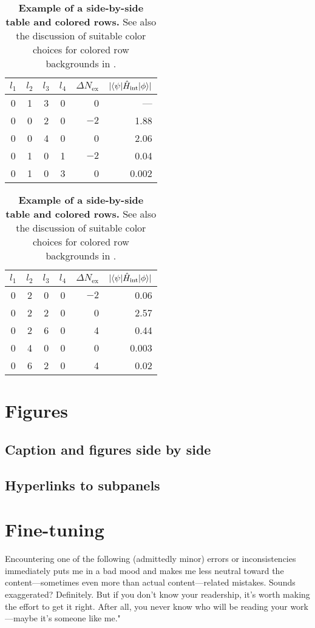 \begin{table}
	\centering 
	\caption{\textbf{Example of a side-by-side table and colored rows.} See also the discussion of suitable color choices for colored row backgrounds in .}
	\label{tab:table3}
	\vspace{5ex}
	\begin{tabular}{ccccrr} 
		\toprule
		$l_1$ & $l_2$ & $l_3$ & $l_4$ & $\Delta N_\text{ex}$ & $|\langle \psi | \hat{H}_\text{int} | \phi \rangle|$  \\ 
		\midrule 
		\rowcolor{pqred} 0 & 1 & 3 & 0 & 0 & ---\\
		0 & 0 & 2 & 0 & $-2$ & 1.88\\
		\rowcolor{pqblue} 0 & 0 & 4 & 0 & 0 & 2.06\\
		0 & 1 & 0 & 1 & $-2$ & 0.04\\
		\rowcolor{pqyellow} 0 & 1 & 0 & 3 & 0 & 0.002\\
		\bottomrule
	\end{tabular}
	\hspace{0.5cm}
	\begin{tabular}{ccccrr} 
		\toprule
		$l_1$ & $l_2$ & $l_3$ & $l_4$ & $\Delta N_\text{ex}$ & $|\langle \psi | \hat{H}_\text{int} | \phi \rangle|$  \\ 
		\midrule 
		0 & 2 & 0 & 0 & $-2$ & 0.06\\
		\rowcolor{pqblue} 0 & 2 & 2 & 0 & 0 & 2.57\\
		0 & 2 & 6 & 0 & 4 & 0.44\\
		\rowcolor{pqyellow} 0 & 4 & 0 & 0 & 0 & 0.003\\
		0 & 6 & 2 & 0 & 4 & 0.02\\
		\bottomrule
	\end{tabular}
\end{table}

\section{Figures}
\subsection{Caption and figures side by side}
\subsection{Hyperlinks to subpanels}

\section{Fine-tuning}
Encountering one of the following (admittedly minor) errors or inconsistencies immediately puts me in a bad mood and makes me less neutral toward the content---sometimes even more than actual content---related mistakes. Sounds exaggerated? Definitely. But if you don’t know your readership, it’s worth making the effort to get it right. After all, you never know who will be reading your work---maybe it’s someone like me."
